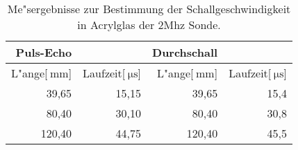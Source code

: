 
\begin{table}[!h]
\begin{center}
\begin{tabular}{|r|r|r|r|}
\hline
Puls-Echo & & Durchschall &\\
\hline
 L"ange[$\SI{}{\milli\meter}$] & Laufzeit[$\SI{}{\micro\second}$] & L"ange[$\SI{}{\milli\meter}$] & Laufzeit[$\SI{}{\micro\second}$]\\
\hline
\hline
 39,65 &	15,15 &	 39,65 &	15,4\\
 80,40 &	30,10 &	 80,40 &	30,8\\
120,40 &	44,75 &	120,40 &	45,5\\
\hline
\end{tabular}
\caption[]{Me"sergebnisse zur Bestimmung der Schallgeschwindigkeit in Acrylglas der 2Mhz Sonde.}
\label{a2}
\end{center}
\end{table}